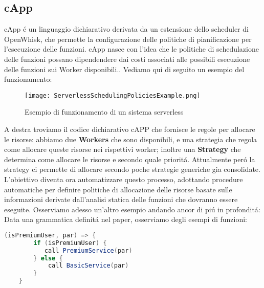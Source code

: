 \documentclass[../main.tex]{subfiles}
\begin{document}
\subsection{cApp}
cApp é un linguaggio dichiarativo derivata da un estensione dello scheduler di OpenWhisk, che permette la configurazione delle politiche di pianificazione per l'esecuzione delle funzioni.
cApp nasce con l'idea che le politiche di schedulazione delle funzioni possano dipendendere dai costi associati alle possibili esecuzione delle funzioni sui Worker disponibili.\autocite{de2020allocation}.
Vediamo qui di seguito un esempio del funzionamento:
\begin{figure}[H]
   \centering
    \texttt{[image: ServerlessSchedulingPoliciesExample.png]}
    \caption{Esempio di funzionamento di un sistema serverless \autocite{deserverless}}
\end{figure}
A destra troviamo il codice dichiarativo cAPP che fornisce le regole per allocare le risorse: abbiamo due \textbf{Workers} che sono disponibili, e una strategia che regola come allocare queste risorse nei rispettivi worker; inoltre una \textbf{Strategy} che determina come allocare le risorse e secondo quale prioritá.
Attualmente peró la strategy ci permette di allocare secondo poche strategie generiche gia consolidate.
L'obiettivo diventa ora automatizzare questo processo, adottando procedure automatiche per definire politiche di allocazione delle risorse basate sulle informazioni derivate dall'analisi statica delle funzioni che dovranno essere eseguite.
Osserviamo adesso un'altro esempio andando ancor di piú in profonditá:
Data una grammatica definitá nel paper\autocite {deserverless}, osserviamo degli esempi di funzioni:
\begin{lstlisting}[language=Java, caption= La guardia della condizione é un espressione,label={lst:1}]
    (isPremiumUser, par) => {
        if (isPremiumUser) {
           call PremiumService(par)
        } else {
            call BasicService(par)
        }
    }
\end{lstlisting}
\end{document}
